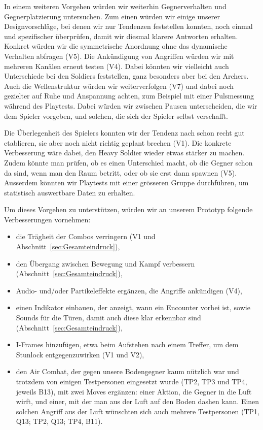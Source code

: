 \documentclass[../Main.tex]{subfiles}
\begin{document}
In einem weiteren Vorgehen würden wir weiterhin Gegnerverhalten und Gegnerplatzierung untersuchen. Zum einen würden wir einige unserer Designvorschläge, bei denen wir nur Tendenzen feststellen konnten, noch einmal und spezifischer überprüfen, damit wir diesmal klarere Antworten erhalten. Konkret würden wir die symmetrische Anordnung ohne das dynamische Verhalten abfragen (V5). Die Ankündigung von Angriffen würden wir mit mehreren Kanälen erneut testen (V4). Dabei könnten wir vielleicht auch Unterschiede bei den Soldiers feststellen, ganz besonders aber bei den Archers. Auch die Wellenstruktur würden wir weiterverfolgen (V7) und dabei noch gezielter auf Ruhe und Anspannung achten, zum Beispiel mit einer Pulsmessung während des Playtests.\autocite[285--287]{drachen2018gamesuserresearch} Dabei würden wir zwischen Pausen unterscheiden, die wir dem Spieler vorgeben, und solchen, die sich der Spieler selbst verschafft.

Die Überlegenheit des Spielers konnten wir der Tendenz nach schon recht gut etablieren, sie aber noch nicht richtig geplant brechen (V1). Die konkrete Verbesserung wäre dabei, den Heavy Soldier wieder etwas stärker zu machen. Zudem könnte man prüfen, ob es einen Unterschied macht, ob die Gegner schon da sind, wenn man den Raum betritt, oder ob sie erst dann spawnen (V5). Ausserdem könnten wir Playtests mit einer grösseren Gruppe durchführen, um statistisch auswertbare Daten zu erhalten.

Um dieses Vorgehen zu unterstützen, würden wir an unserem Prototyp folgende Verbesserungen vornehmen:

\begin{itemize}[leftmargin=1.5cm]
    \item die Trägheit der Combos verringern (V1 und Abschnitt~\ref{sec:Gesamteindruck}),
    \item den Übergang zwischen Bewegung und Kampf verbessern (Abschnitt~\ref{sec:Gesamteindruck}),
    \item Audio- und/oder Partikeleffekte ergänzen, die Angriffe ankündigen (V4),
    \item einen Indikator einbauen, der anzeigt, wann ein Encounter vorbei ist, sowie Sounds für die Türen, damit auch diese klar erkennbar sind (Abschnitt~\ref{sec:Gesamteindruck}),
    \item I-Frames hinzufügen, etwa beim Aufstehen nach einem Treffer, um dem Stunlock entgegenzuwirken (V1 und V2),
    \item den Air Combat, der gegen unsere Bodengegner kaum nützlich war und trotzdem von einigen Testpersonen eingesetzt wurde (TP2, TP3 und TP4, jeweils B13), mit zwei Moves ergänzen: einer Aktion, die Gegner in die Luft wirft, und einer, mit der man aus der Luft auf den Boden dashen kann. Einen solchen Angriff aus der Luft wünschten sich auch mehrere Testpersonen (TP1, Q13; TP2, Q13; TP4, B11).
\end{itemize}
\end{document}
